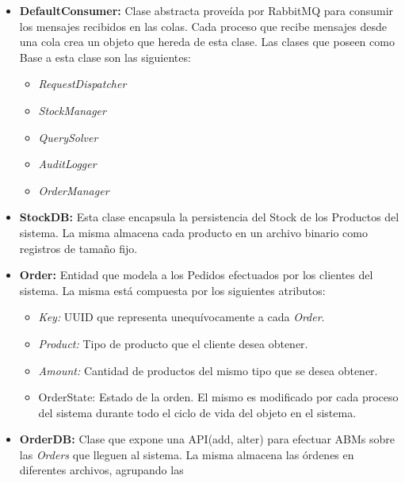         \begin{itemize}
            \item \textbf{DefaultConsumer:} Clase abstracta proveída por 
            RabbitMQ para consumir los mensajes recibidos en las colas. Cada 
            proceso que recibe mensajes desde una cola crea un objeto que 
            hereda de esta clase. Las clases que poseen como Base a esta clase
            son las siguientes:
            \begin{itemize}
                \item \textit{RequestDispatcher}
                \item \textit{StockManager}
                \item \textit{QuerySolver}
                \item \textit{AuditLogger}
                \item \textit{OrderManager}
            \end{itemize}
            \item \textbf{StockDB:} Esta clase encapsula la persistencia del 
            Stock de los Productos del sistema. La misma almacena cada 
            producto en un archivo binario como registros de tamaño fijo. 
            \item \textbf{Order:} Entidad que modela a los Pedidos efectuados
            por los clientes del sistema. La misma está compuesta por los 
            siguientes atributos:
                \begin{itemize}
                    \item \textit{Key:} UUID que representa unequívocamente a 
                    cada \textit{Order}. 
                    \item \textit{Product:} Tipo de producto que el cliente
                    desea obtener.
                    \item \textit{Amount:} Cantidad de productos del mismo
                    tipo que se desea obtener.
                    \item{OrderState:} Estado de la orden. El mismo es 
                    modificado por cada proceso del sistema durante todo el 
                    ciclo de vida del objeto en el sistema.
                \end{itemize}
            \item \textbf{OrderDB:} Clase que expone una API(add, alter) para 
            efectuar ABMs sobre las \textit{Orders} que lleguen al sistema. La
            misma almacena las órdenes en diferentes archivos, agrupando las 

\end{itemize}
